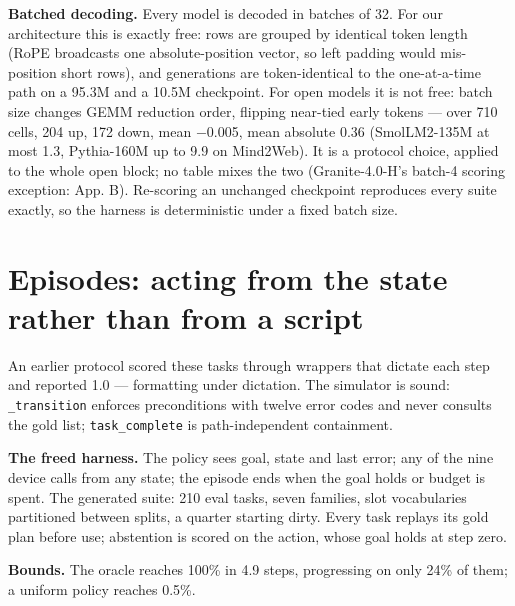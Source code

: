 \documentclass{article}
\begin{document}
\textbf{Batched decoding.} Every model is decoded in batches of 32. For our architecture this is
exactly free: rows are grouped by identical token length (RoPE broadcasts one absolute-position
vector, so left padding would mis-position short rows), and generations are token-identical to
the one-at-a-time path on a 95.3M and a 10.5M checkpoint. For open models it is not free: batch
size changes GEMM reduction order, flipping near-tied early tokens --- over 710 cells, 204
up, 172 down, mean $-$0.005, mean absolute 0.36 (SmolLM2-135M at most 1.3, Pythia-160M up to
9.9 on Mind2Web). It is a protocol choice, applied to the whole open block; no table mixes the
two (Granite-4.0-H's batch-4 scoring exception: App. B). Re-scoring an unchanged checkpoint reproduces every
suite exactly, so the harness is deterministic under a fixed batch size.

\section{Episodes: acting from the state rather than from a script}
An earlier protocol scored these tasks through wrappers that dictate each step and reported 1.0 --- formatting under dictation. The simulator is sound: \texttt{\_transition} enforces preconditions with twelve error codes and never consults the gold list; \texttt{task\_complete} is path-independent containment.


\textbf{The freed harness.} The policy sees goal, state and last error; any of the nine device calls from any state; the episode ends when the goal holds or budget is spent. The generated suite: 210 eval tasks, seven families, slot vocabularies partitioned between splits, a quarter starting dirty. Every task replays its gold plan before use; abstention is scored on the action, whose goal holds at step zero.


\textbf{Bounds.} The oracle reaches 100\% in 4.9 steps, progressing on only 24\% of them; a uniform policy reaches 0.5\%.
\end{document}
